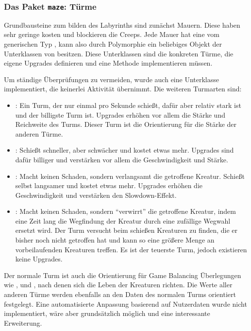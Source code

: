 \subsubsection{Das Paket \texttt{maze}: Türme} %
\label{ssub:maze_türme}

Grundbausteine zum bilden des Labyrinths sind zunächst Mauern. Diese haben sehr geringe kosten und blockieren die Creeps. Jede Mauer hat eine  vom generischen Typ , kann also durch Polymorphie ein beliebiges Objekt der Unterklassen von  besitzen. Diese Unterklassen sind die konkreten Türme, die eigene Upgrades definieren und eine Methode  implementieren müssen.

Um ständige  Überprüfungen zu vermeiden, wurde auch eine Unterklasse  implementiert, die keinerlei Aktivität übernimmt. Die weiteren Turmarten sind:
\begin{itemize}
  \item {}: Ein Turm, der nur einmal pro Sekunde schießt, dafür aber relativ stark ist und der billigste Turm ist. Upgrades erhöhen vor allem die Stärke und Reichweite des Turms. Dieser Turm ist die Orientierung für die Stärke der anderen Türme.
  \item {}: Schießt schneller, aber schwächer und kostet etwas mehr. Upgrades sind dafür billiger und verstärken vor allem die Geschwindigkeit und Stärke.
  \item {}: Macht keinen Schaden, sondern verlangsamt die getroffene Kreatur. Schießt selbst langsamer und kostet etwas mehr. Upgrades erhöhen die Geschwindigkeit und verstärken den Slowdown-Effekt.
  \item {}: Macht keinen Schaden, sondern \enquote{verwirrt} die getroffene Kreatur, indem eine Zeit lang die Wegfindung der Kreatur durch eine zufällige Wegwahl ersetzt wird. Der Turm versucht beim schießen Kreaturen zu finden, die er bisher noch nicht getroffen hat und kann so eine größere Menge an vorbeilaufenden Kreaturen treffen. Es ist der teuerste Turm, jedoch existieren keine Upgrades.
\end{itemize}

Der normale Turm ist auch die Orientierung für Game Balancing Überlegungen wie , und , nach denen sich die Leben der Kreaturen richten. Die Werte aller anderen Türme werden ebenfalls an den Daten des normalen Turms orientiert festgelegt. Eine automatisierte Anpassung basierend auf Nutzerdaten wurde nicht implementiert, wäre aber grundsätzlich möglich und eine interessante Erweiterung. 

